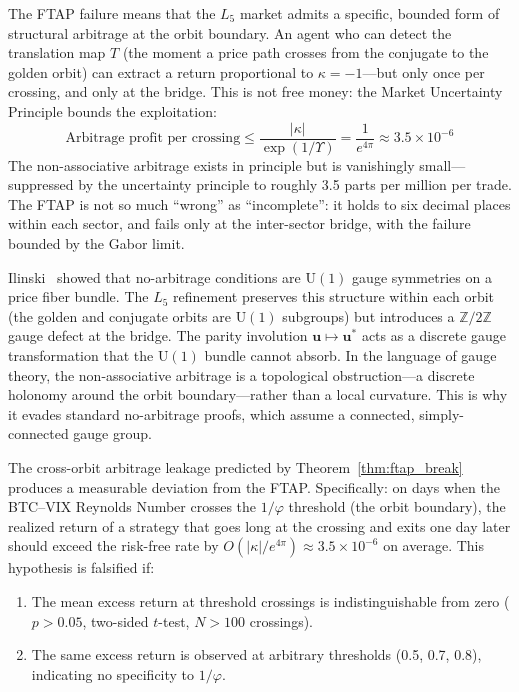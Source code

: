\begin{remark}
The FTAP failure means that the $L_5$ market admits a specific, bounded form of structural arbitrage at the orbit boundary. An agent who can detect the translation map $T$ (the moment a price path crosses from the conjugate to the golden orbit) can extract a return proportional to $\kappa = -1$---but only once per crossing, and only at the bridge. This is not free money: the Market Uncertainty Principle bounds the exploitation:
$$\text{Arbitrage profit per crossing} \leq \frac{|\kappa|}{\exp(1/\Upsilon)} = \frac{1}{e^{4\pi}} \approx 3.5 \times 10^{-6}$$
The non-associative arbitrage exists in principle but is vanishingly small---suppressed by the uncertainty principle to roughly 3.5 parts per million per trade. The FTAP is not so much ``wrong'' as ``incomplete'': it holds to six decimal places within each sector, and fails only at the inter-sector bridge, with the failure bounded by the Gabor limit.
\end{remark}

\begin{remark}
Ilinski~\cite{ilinski1997} showed that no-arbitrage conditions are $\mathrm{U}(1)$ gauge symmetries on a price fiber bundle. The $L_5$ refinement preserves this structure within each orbit (the golden and conjugate orbits are $\mathrm{U}(1)$ subgroups) but introduces a $\mathbb{Z}/2\mathbb{Z}$ gauge defect at the bridge. The parity involution $\mathbf{u} \mapsto \mathbf{u}^*$ acts as a discrete gauge transformation that the $\mathrm{U}(1)$ bundle cannot absorb. In the language of gauge theory, the non-associative arbitrage is a topological obstruction---a discrete holonomy around the orbit boundary---rather than a local curvature. This is why it evades standard no-arbitrage proofs, which assume a connected, simply-connected gauge group.
\end{remark}

\begin{hypothesis}\label{hyp:ftap}
The cross-orbit arbitrage leakage predicted by Theorem~\ref{thm:ftap_break} produces a measurable deviation from the FTAP. Specifically: on days when the BTC--VIX Reynolds Number crosses the $1/\varphi$ threshold (the orbit boundary), the realized return of a strategy that goes long at the crossing and exits one day later should exceed the risk-free rate by $O(|\kappa|/e^{4\pi}) \approx 3.5 \times 10^{-6}$ on average. This hypothesis is falsified if:
\begin{enumerate}[noitemsep]
\item The mean excess return at threshold crossings is indistinguishable from zero ($p > 0.05$, two-sided $t$-test, $N > 100$ crossings).
\item The same excess return is observed at arbitrary thresholds (0.5, 0.7, 0.8), indicating no specificity to $1/\varphi$.
\end{enumerate}
\end{hypothesis}


